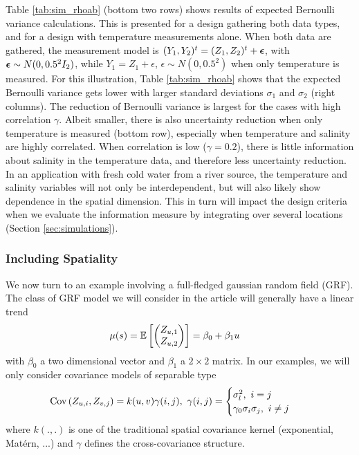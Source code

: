 \documentclass[aoas]{imsart}
\begin{document}
Table \ref{tab:sim_rhoab} (bottom two rows) shows results of expected
Bernoulli variance calculations. This is presented for a design
gathering both data types, and for a design with temperature
measurements alone. When both data are gathered, the measurement model is
$(Y_1,Y_2)^t=(Z_1,Z_2)^t+{\boldsymbol \epsilon}$, with ${\boldsymbol \epsilon} \sim N(0,0.5^2I_2)$, while $Y_1=Z_1+\epsilon$, $\epsilon \sim N(0,0.5^2)$ when only temperature is measured.
For this illustration, Table \ref{tab:sim_rhoab} shows that the
expected Bernoulli variance gets lower with larger standard deviations
$\sigma_1$ and $\sigma_2$ (right columns). The reduction of Bernoulli
variance is largest for the cases with high correlation
$\gamma$. Albeit smaller, there is also uncertainty reduction when
only temperature is measured (bottom row), especially when temperature
and salinity are highly correlated. When correlation is low
($\gamma=0.2$), there is little information about salinity in the
temperature data, and therefore less uncertainty reduction. In an
application with fresh cold water from a river source, the temperature
and salinity variables will not only be interdependent, but will also
likely show dependence in the spatial dimension. This in turn will
impact the design criteria when we evaluate the information measure by
integrating over several locations (Section \ref{sec:simulations}).

\subsubsection{Including Spatiality}
We now turn to an example involving a full-fledged gaussian random field (GRF). The class of GRF model we will consider in the article will generally have a linear trend
\begin{align*}
\mu(s)=\mathbb{E}\left[\begin{pmatrix}
Z_{\spatloc, 1}\\ Z_{\spatloc, 2}
\end{pmatrix}\right] &= \beta_0 + \beta_1 \spatloc
\end{align*}
with $\beta_0$ a two dimensional vector and $\beta_1$ a $2\times 2$ matrix. In our examples, we will only consider covariance models of separable type
\begin{align*}
\textrm{Cov}\left(Z_{\spatloc, i}, Z_{v, j}\right) &= k(\spatloc, v) \gamma(i, j),~ \gamma(i, j) = \begin{cases} \sigma_l^2,~ i=j\\
   \gamma_0 \sigma_i \sigma_j,~i\neq j
        \end{cases}
\end{align*}
where $k(., .)$ is one of the traditional spatial covariance kernel (exponential, Mat\'{e}rn, ...) and $\gamma$ defines the cross-covariance structure.
\end{document}

